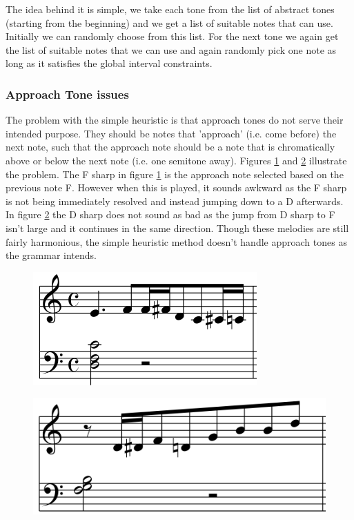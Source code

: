 \documentclass[pdftex,12pt,a4paper]{report}
\begin{document}
The idea behind it is simple, we take each tone from the list of abstract tones (starting from the beginning) and we get a list of suitable notes that can use. Initially we can randomly choose from this list. For the next tone we again get the list of suitable notes that we can use and again randomly pick one note as long as it satisfies the global interval constraints.

\subsubsection{Approach Tone issues}
The problem with the simple heuristic is that approach tones do not serve their intended purpose. They should be notes that 'approach' (i.e. come before) the next note, such that the approach note should be a note that is chromatically above or below the next note (i.e. one semitone away). Figures \ref{fig:lookbehindnoteselector} and \ref{fig:lookbehindnoteselector2} illustrate the problem. The F sharp in figure \ref{fig:lookbehindnoteselector} is the approach note selected based on the previous note F. However when this is played, it sounds awkward as the F sharp is not being immediately resolved and instead jumping down to a D afterwards. In figure \ref{fig:lookbehindnoteselector2} the D sharp does not sound as bad as the jump from D sharp to F isn't large and it continues in the same direction. Though these melodies are still fairly harmonious, the simple heuristic method doesn't handle approach tones as the grammar intends.

\begin{figure}[here]
  \centering
  \includegraphics[scale=0.6]{figure/lookbehindnoteselector.png}
  \label{fig:lookbehindnoteselector}
\end{figure}

\begin{figure}[here]
  \centering
  \includegraphics[scale=0.5]{figure/lookbehindnoteselector2.png}
  \label{fig:lookbehindnoteselector2}
\end{figure}
\end{document}
